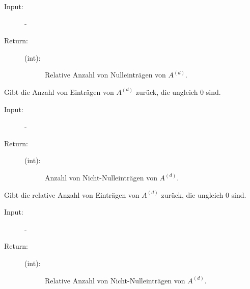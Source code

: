 \documentclass[a4paper,10pt,ngerman, openright]{sphinxmanual}
\begin{document}
\begin{fulllineitems}
\begin{fulllineitems}
\begin{description}
\item[{Input:}] -\leavevmode
\item[{Return:}] \leavevmode\begin{description}
\item[{(int):}] \leavevmode
Relative Anzahl von Nulleinträgen von $A^{(d)}$.

\end{description}

\end{description}

\end{fulllineitems}


\begin{fulllineitems}
\label{\detokenize{index:sparse.Sparse.anz_nn_abs}}
Gibt die Anzahl von Einträgen von $A^{(d)}$ zurück, die ungleich 0 sind.

\begin{description}
\item[{Input:}] -\leavevmode
\item[{Return:}] \leavevmode\begin{description}
\item[{(int):}] \leavevmode
Anzahl von Nicht-Nulleinträgen von $A^{(d)}$.

\end{description}

\end{description}

\end{fulllineitems}


\begin{fulllineitems}
\label{\detokenize{index:sparse.Sparse.anz_nn_rel}}
Gibt die relative Anzahl von Einträgen von $A^{(d)}$ zurück, die ungleich 0 sind.

\begin{description}
\item[{Input:}] -\leavevmode
\item[{Return:}] \leavevmode\begin{description}
\item[{(int):}] \leavevmode
Relative Anzahl von Nicht-Nulleinträgen von $A^{(d)}$.


\end{description}
\end{description}
\end{fulllineitems}
\end{fulllineitems}
\end{document}
